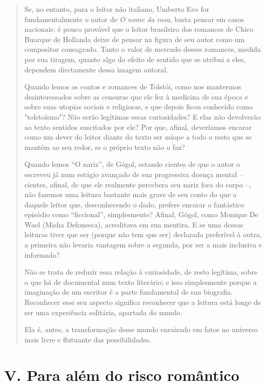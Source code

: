 \begin{quote}
Se, no entanto, para o leitor não italiano, Umberto Eco for
fundamentalmente o autor de \emph{O nome da rosa}, basta pensar em casos
nacionais: é pouco provável que o leitor brasileiro dos romances de
Chico Buarque de Hollanda deixe de pensar na figura de seu autor como um
compositor consagrado. Tanto o valor de mercado desses romances, medida
por sua tiragem, quanto algo do efeito de sentido que se atribui a eles,
dependem diretamente dessa imagem autoral.

Quando lemos os contos e romances de Tolstói, como nos mantermos
desinteressados sobre as censuras que ele fez à medicina de sua época e
sobre suas utopias sociais e religiosas, e que depois ficou conhecido
como "tolstoísmo"? Não serão legítimas essas curiosidades? E elas não
devolverão ao texto sentidos suscitados por ele? Por que, afinal,
deveríamos encarar como um dever do leitor diante do texto ser míope a
todo o resto que se mantém ao seu redor, se o próprio texto não o faz?

Quando lemos ``O nariz'', de Gógol, estando cientes de que o autor o
escreveu já num estágio avançado de sua progressiva doença mental --
cientes, afinal, de que ele realmente percebera seu nariz fora do corpo
--, não fazemos uma leitura bastante mais grave de seu conto do que a
daquele leitor que, desconhecendo o dado, prefere encarar o fantástico
episódio como ``ficcional'', simplesmente? Afinal, Gógol, como Monique
De Wael (Misha Defonseca), acreditava em sua mentira. E se uma dessas
leituras tiver que ser (porque não tem que ser) declarada preferível à
outra, a primeira não levaria vantagem sobre a segunda, por ser a mais
inclusiva e informada?

Não se trata de reduzir essa relação à curiosidade, de resto legítima,
sobre o que há de documental num texto literário; e isso simplesmente
porque a imaginação de um escritor é a parte fundamental de sua
biografia. Reconhecer esse seu aspecto significa reconhecer que a
leitura está longe de ser uma experiência solitária, apartada do mundo.

Ela é, antes, a transformação desse mundo enraizado em fatos no universo
mais livre e flutuante das possibilidades.
\end{quote}

\section*{V. Para além do risco romântico}

